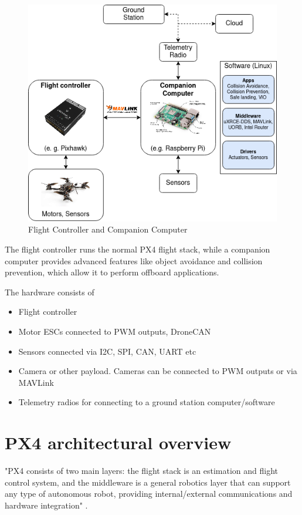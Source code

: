 \documentclass[journal]{IEEEtran}
\begin{document}
\begin{figure}
    \centering
    \includegraphics[scale=0.4]{Images/px4_general_architecture.png}
    \caption{Flight Controller and Companion Computer}
    \label{fig:px4_general_architecture}
\end{figure}

The flight controller runs the normal PX4 flight stack, while a companion computer provides advanced features like object avoidance and collision prevention, which allow it to perform offboard applications.

The hardware consists of

\begin{itemize}
    \item Flight controller
    \item Motor ESCs connected to PWM outputs, DroneCAN
    \item Sensors connected via I2C, SPI, CAN, UART etc
    \item Camera or other payload. Cameras can be connected to PWM outputs or via MAVLink
    \item Telemetry radios for connecting to a ground station computer/software
\end{itemize}

\section{PX4 architectural overview}
\label{px4_arch_overview}
"PX4 consists of two main layers: the flight stack is an estimation and flight control system, and the middleware is a general robotics layer that can support any type of autonomous robot, providing internal/external communications and hardware integration" \cite{px4_architecture_flight_stack}.
\end{document}
